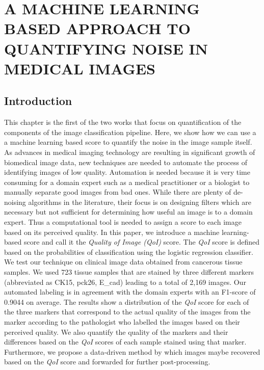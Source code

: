 \chapter{A MACHINE LEARNING BASED APPROACH TO QUANTIFYING NOISE IN MEDICAL IMAGES}
\label{chap:SPIE1}

\let\thefootnote\relax{}

\section{Introduction}

This chapter is the first of the two works that focus on quantification of the components of the image classification pipeline. Here, we show how we can use a a machine learning based score to quantify the noise in the image sample itself. 
As advances in medical imaging technology are resulting in significant growth of biomedical image data, new techniques are needed to automate the process of identifying images of low quality. Automation is needed because it is very time consuming for a domain expert such as a medical practitioner or a biologist to manually separate good images from bad ones. While there are plenty of de-noising algorithms in the literature, their focus is on designing filters which are necessary but not sufficient for determining how useful an image is to a domain expert.
Thus a computational tool is needed to assign a score to each image based on its perceived quality. In this paper, we introduce a machine learning-based score and call it the \textit{Quality of Image (QoI)} score. The \textit{QoI} score is defined based on the probabilities of classification using the logistic regression classifier.
We test our technique on clinical image data obtained from cancerous tissue samples. We used 723 tissue samples that are stained by three different markers (abbreviated as CK15, pck26, E\_cad) leading to a total of 2,169 images. Our automated labeling is in agreement with the domain experts with an F1-score of 0.9044 on average. The results show a distribution of the \textit{QoI} score for each of the three markers that correspond to the actual quality of the images from the marker according to the pathologist who labelled the images based on their perceived quality.  We also quantify the quality of the markers and their differences based on the \textit{QoI} scores of each sample stained using that marker. 
Furthermore, we propose a data-driven method by which images maybe recovered based on the \textit{QoI} score and forwarded for further post-processing.

